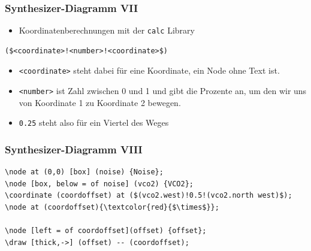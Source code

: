 \documentclass[14pt,ngerman]{beamer}
\begin{document}
\begin{frame}[containsverbatim]
\frametitle{Synthesizer-Diagramm VII}

\begin{itemize}
\item Koordinatenberechnungen mit der \texttt{calc} Library
\end{itemize}

\begin{lstlisting}
($<coordinate>!<number>!<coordinate>$)
\end{lstlisting}

\begin{itemize}
	\item \texttt{<coordinate>} steht dabei für eine Koordinate, ein Node ohne Text ist.
	\item  \texttt{<number>} ist Zahl zwischen 0 und 1 und gibt die Prozente an, um den wir uns von Koordinate 1 zu Koordinate 2 bewegen. 
	\item  \texttt{0.25} steht also für ein Viertel des Weges 
\end{itemize}

\end{frame}

\begin{frame}[containsverbatim]
\frametitle{Synthesizer-Diagramm VIII}


\begin{lstlisting}
\node at (0,0) [box] (noise) {Noise};
\node [box, below = of noise] (vco2) {VCO2};
\coordinate (coordoffset) at ($(vco2.west)!0.5!(vco2.north west)$);
\node at (coordoffset){\textcolor{red}{$\times$}};

\node [left = of coordoffset](offset) {offset};
\draw [thick,->] (offset) -- (coordoffset);
\end{lstlisting}

\begin{center}
\end{center}

\end{frame}
\end{document}
